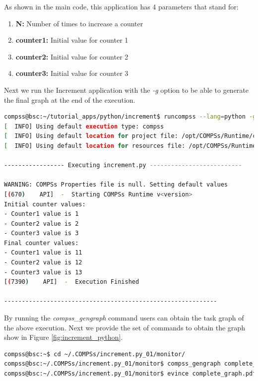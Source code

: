 As shown in the main code, this application has 4 parameters that stand for:

\begin{enumerate}
 \item \textbf{N:} Number of times to increase a counter
 \item \textbf{counter1:} Initial value for counter 1
 \item \textbf{counter2:} Initial value for counter 2
 \item \textbf{counter3:} Initial value for counter 3
\end{enumerate}

Next we run the Increment application with the \textit{-g} option to be able to generate the final graph at the end of the execution.

\begin{lstlisting}[language=bash]
compss@bsc:~/tutorial_apps/python/increment$ runcompss --lang=python -g ~/tutorial_apps/python/increment/increment.py 10 1 2 3
[  INFO] Using default execution type: compss
[  INFO] Using default location for project file: /opt/COMPSs/Runtime/configuration/xml/projects/default_project.xml
[  INFO] Using default location for resources file: /opt/COMPSs/Runtime/configuration/xml/resources/default_resources.xml

----------------- Executing increment.py --------------------------

WARNING: COMPSs Properties file is null. Setting default values
[(670)    API]  -  Starting COMPSs Runtime v<version>
Initial counter values:
- Counter1 value is 1
- Counter2 value is 2
- Counter3 value is 3
Final counter values:
- Counter1 value is 11
- Counter2 value is 12
- Counter3 value is 13
[(7390)    API]  -  Execution Finished

------------------------------------------------------------
\end{lstlisting}

By running the \textit{compss\_gengraph} command users can obtain the task graph of the above execution. Next we provide the set of commands
to obtain the graph show in Figure \ref{fig:increment_python}.

\begin{lstlisting}[language=bash]
compss@bsc:~$ cd ~/.COMPSs/increment.py_01/monitor/
compss@bsc:~/.COMPSs/increment.py_01/monitor$ compss_gengraph complete_graph.dot
compss@bsc:~/.COMPSs/increment.py_01/monitor$ evince complete_graph.pdf
\end{lstlisting}

